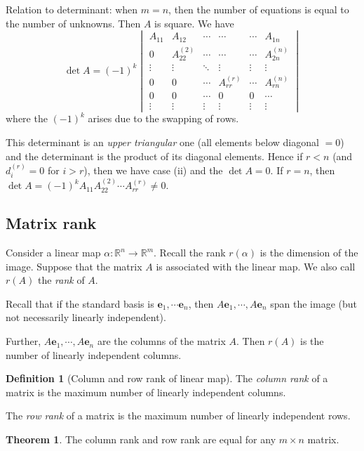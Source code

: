 \documentclass[a4paper]{article}
\theoremstyle{definition}
\newtheorem*{thm}{Theorem}
\newtheorem*{defi}{Definition}
\newcommand{\mb}[1]{\mathbf{#1}}
\newcommand{\R}{\mathbb{R}}
\begin{document}
Relation to determinant: when $m = n$, then the number of equations is equal to the number of unknowns. Then $A$ is square. We have
\[
\det A  = (-1)^k
\begin{vmatrix}
  A_{11} &A_{12}&\cdots& \cdots& \cdots & A_{1n}\\
  0 & A_{22}^{(2)} &\cdots& \cdots & \cdots & A_{2n}^{(n)} \\
  \vdots & \vdots &\ddots & \vdots & \vdots & \vdots\\
  0 & 0 & \cdots & A_{rr}^{(r)} & \cdots & A_{rn}^{(n)}\\
  0 & 0 & \cdots & 0 & 0 & \cdots\\
  \vdots & \vdots & \vdots & \vdots & \vdots & \vdots
\end{vmatrix}
\]
where the $(-1)^k$ arises due to the swapping of rows.

This determinant is an \emph{upper triangular} one (all elements below diagonal $= 0$) and the determinant is the product of its diagonal elements.
Hence if $r < n$ (and $d_i^{(r)} = 0$ for $i > r$), then we have case (ii) and the $\det A = 0$. If $r = n$, then $\det A = (-1)^k A_{11}A_{22}^{(2)}\cdots A_{rr}^{(r)} \not= 0$.

\subsection{Matrix rank}
Consider a linear map $\alpha: \R^n\to \R^m$. Recall the rank $r(\alpha)$ is the dimension of the image. Suppose that the matrix $A$ is associated with the linear map. We also call $r(A)$ the \emph{rank} of $A$.

Recall that if the standard basis is $\mb{e}_1,\cdots \mb{e}_n$, then $A\mb{e}_1, \cdots, A\mb{e}_n$ span the image (but not necessarily linearly independent).

Further, $A\mb{e}_1, \cdots, A\mb{e}_n$ are the columns of the matrix $A$. Then $r(A)$ is the number of linearly independent columns.

\begin{defi}[Column and row rank of linear map]
  The \emph{column rank} of a matrix is the maximum number of linearly independent columns.

The \emph{row rank} of a matrix is the maximum number of linearly independent rows.
\end{defi}

\begin{thm}
  The column rank and row rank are equal for any $m\times n$ matrix.
\end{thm}
\end{document}
